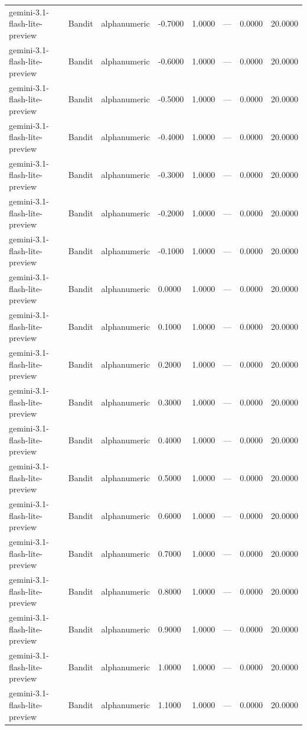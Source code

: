 \begin{table}
\begin{tabular}{llllrrrr}
gemini-3.1-flash-lite-preview & Bandit & alphanumeric & -0.7000 & 1.0000 & --- & 0.0000 & 20.0000 \\
gemini-3.1-flash-lite-preview & Bandit & alphanumeric & -0.6000 & 1.0000 & --- & 0.0000 & 20.0000 \\
gemini-3.1-flash-lite-preview & Bandit & alphanumeric & -0.5000 & 1.0000 & --- & 0.0000 & 20.0000 \\
gemini-3.1-flash-lite-preview & Bandit & alphanumeric & -0.4000 & 1.0000 & --- & 0.0000 & 20.0000 \\
gemini-3.1-flash-lite-preview & Bandit & alphanumeric & -0.3000 & 1.0000 & --- & 0.0000 & 20.0000 \\
gemini-3.1-flash-lite-preview & Bandit & alphanumeric & -0.2000 & 1.0000 & --- & 0.0000 & 20.0000 \\
gemini-3.1-flash-lite-preview & Bandit & alphanumeric & -0.1000 & 1.0000 & --- & 0.0000 & 20.0000 \\
gemini-3.1-flash-lite-preview & Bandit & alphanumeric & 0.0000 & 1.0000 & --- & 0.0000 & 20.0000 \\
gemini-3.1-flash-lite-preview & Bandit & alphanumeric & 0.1000 & 1.0000 & --- & 0.0000 & 20.0000 \\
gemini-3.1-flash-lite-preview & Bandit & alphanumeric & 0.2000 & 1.0000 & --- & 0.0000 & 20.0000 \\
gemini-3.1-flash-lite-preview & Bandit & alphanumeric & 0.3000 & 1.0000 & --- & 0.0000 & 20.0000 \\
gemini-3.1-flash-lite-preview & Bandit & alphanumeric & 0.4000 & 1.0000 & --- & 0.0000 & 20.0000 \\
gemini-3.1-flash-lite-preview & Bandit & alphanumeric & 0.5000 & 1.0000 & --- & 0.0000 & 20.0000 \\
gemini-3.1-flash-lite-preview & Bandit & alphanumeric & 0.6000 & 1.0000 & --- & 0.0000 & 20.0000 \\
gemini-3.1-flash-lite-preview & Bandit & alphanumeric & 0.7000 & 1.0000 & --- & 0.0000 & 20.0000 \\
gemini-3.1-flash-lite-preview & Bandit & alphanumeric & 0.8000 & 1.0000 & --- & 0.0000 & 20.0000 \\
gemini-3.1-flash-lite-preview & Bandit & alphanumeric & 0.9000 & 1.0000 & --- & 0.0000 & 20.0000 \\
gemini-3.1-flash-lite-preview & Bandit & alphanumeric & 1.0000 & 1.0000 & --- & 0.0000 & 20.0000 \\
gemini-3.1-flash-lite-preview & Bandit & alphanumeric & 1.1000 & 1.0000 & --- & 0.0000 & 20.0000 \\

\end{tabular}
\end{table}
